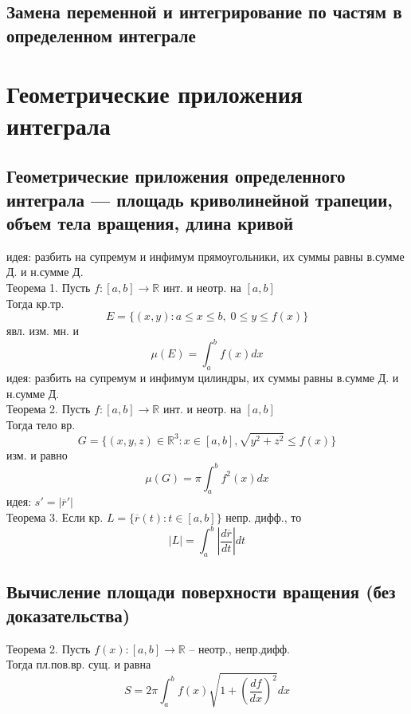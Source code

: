 \documentclass{article}
\begin{document}
\subsection{Замена переменной и интегрирование по частям в определенном интеграле}


\newpage
\section{Геометрические приложения интеграла}
\subsection{Геометрические приложения определенного интеграла — площадь криволинейной трапеции, объем тела вращения, длина кривой}
идея: разбить на супремум и инфимум прямоугольники, их суммы равны в.сумме Д. и н.сумме Д. \\
Теорема 1. Пусть $f:[a,b] \rightarrow \mathbb R$ инт. и неотр. на $[a,b]$ \\
Тогда кр.тр. 
\begin{equation*}
    E = \{ (x,y): a \leq x \leq b, \; 0 \leq y \leq f(x) \}
\end{equation*}
явл. изм. мн. и
\begin{equation*}
    \mu (E) = \int_a^b f(x) dx
\end{equation*}
идея: разбить на супремум и инфимум цилиндры, их суммы равны в.сумме Д. и н.сумме Д. \\
Теорема 2. Пусть $f:[a,b]\rightarrow\mathbb R$ инт. и неотр. на $[a,b]$ \\
Тогда тело вр.
\begin{equation*}
    G = \{ (x,y,z) \in \mathbb R^3: x \in [a,b], \sqrt{y^2+z^2} \leq f(x) \}
\end{equation*}
изм. и равно
\begin{equation*}
    \mu(G) = \pi \int_a^b f^2(x) dx
\end{equation*}
идея: $s' = |\overline{r}'|$ \\
Теорема 3. Если кр. $L = \{ \overline{r}(t): t \in [a,b] \}$ непр. дифф., то
\begin{equation*}
    |L| = \int_a^b |\frac{d\overline{r}}{dt}| dt
\end{equation*}
\subsection{Вычисление площади поверхности вращения (без
доказательства)}
Теорема 2. Пусть $f(x): [a,b] \rightarrow \mathbb R$ -- неотр., непр.дифф. \\
Тогда пл.пов.вр. сущ. и равна
\begin{equation*}
    S = 2\pi \int_a^b f(x) \sqrt{1+(\frac{df}{dx})^2}dx
\end{equation*}
\end{document}
